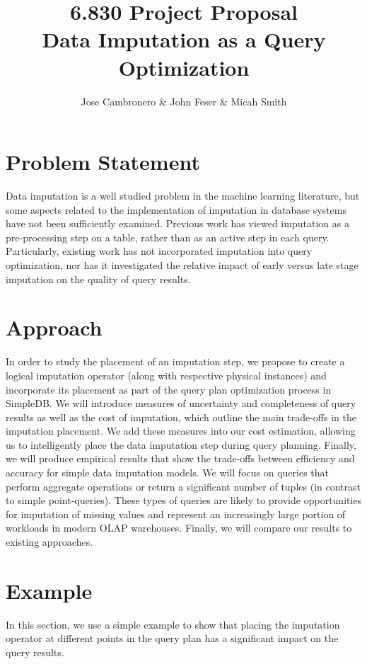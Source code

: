 \documentclass{article}
\title{6.830 Project Proposal \\
  \large Data Imputation as a Query Optimization}
\author{Jose Cambronero \& John Feser \& Micah Smith}
\begin{document}
\maketitle

\section{Problem Statement}
Data imputation is a well studied problem in the machine learning literature, but some aspects related to the implementation of imputation in database systems have not been sufficiently examined. Previous work has viewed imputation as a pre-processing step on a table, rather than as an active step in each query. Particularly, existing work has not incorporated imputation into query optimization, nor has it investigated the relative impact of early versus late stage imputation on the quality of query results.

\section{Approach}
In order to study the placement of an imputation step, we propose to create a logical imputation operator (along with respective physical instances) and incorporate its placement as part of the query plan optimization process in SimpleDB.  We will introduce measures of uncertainty and completeness of query results as well as the cost of imputation, which outline the main trade-offs in the imputation placement. We add these measures into our cost estimation, allowing us to intelligently place the data imputation step during query planning. Finally, we will produce empirical results that show the trade-offs between efficiency and accuracy for simple data imputation models. We will focus on queries that perform aggregate operations or return a significant number of tuples (in contrast to simple point-queries).  These types of queries are likely to provide opportunities for imputation of missing values and represent an increasingly large portion of workloads in modern OLAP warehouses. Finally, we will compare our results to existing approaches.

\section{Example}
In this section, we use a simple example to show that placing the imputation operator at different points in the query plan has a significant impact on the query results.
\end{document}
